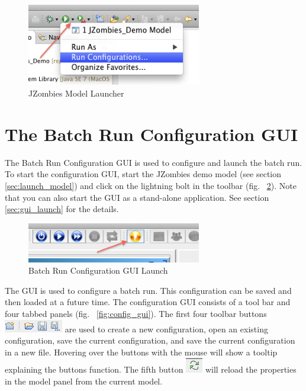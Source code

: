 \documentclass[11pt]{amsart}
\begin{document}
\begin{figure}[h]
\begin{center}
\vspace{.2in}
\centerline {
\includegraphics[width=3in]{images/zombies_launch.png}
}
\caption{JZombies Model Launcher}
\label{fig:launch}
\end{center}
\end{figure}

\section{The Batch Run Configuration GUI}
\label{sec:gui}
The  Batch Run Configuration GUI is used to configure and launch the batch run. To start the configuration GUI, start the JZombies demo model (see section \ref{sec:launch_model}) and click on the lightning bolt in the toolbar (fig. ~\ref{fig:gui_launch}). Note that you can also start the GUI as a stand-alone application. See section \ref{sec:gui_launch} for the details.

\begin{figure}[h]
\begin{center}
\vspace{.2in}
\centerline {
\includegraphics[width=3in]{images/gui_launch.png}
}
\caption{Batch Run Configuration GUI Launch}
\label{fig:gui_launch}
\end{center}
\end{figure}

The GUI is used to configure a batch run. This configuration can be saved and then loaded at a future time. The configuration GUI consists of a tool bar and four tabbed panels (fig. ~\ref{fig:config_gui}). The first four toolbar buttons \includegraphics[height=.2in]{images/gui_file_buttons.png} are used to create a new configuration, open an existing configuration, save the current configuration, and save the current configuration in a new file. Hovering over the buttons with the mouse will show a tooltip explaining the buttons function.  The fifth button \includegraphics[height=.2in]{images/reload_button.png} will reload the properties in the model panel from the current model.
\end{document}
